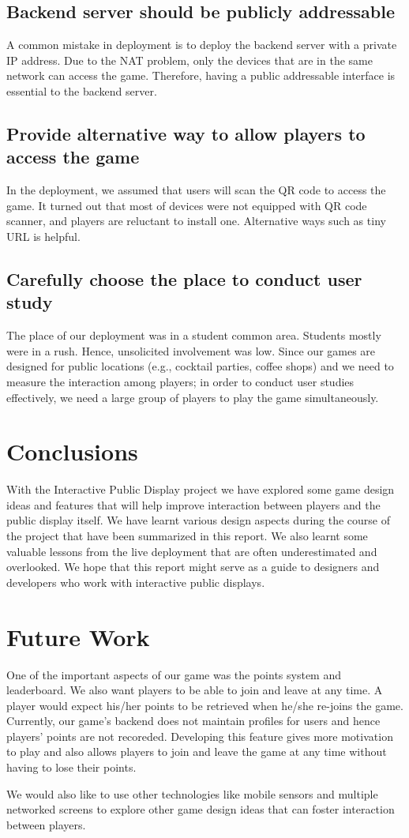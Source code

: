 \documentclass{sig-alternate}
\begin{document}
\subsection{Backend server should be publicly addressable}
A common mistake in 
deployment is to deploy the backend server with a private IP address. Due to 
the NAT problem, only the devices that are in the same network can access the 
game. Therefore, having a public addressable interface is essential to the backend server.

\subsection{Provide alternative way to allow players to access the game}
In the deployment, we assumed 
that users will scan the QR code to access the game. It turned out that most of devices 
were not equipped with QR code scanner, and players are reluctant to install one. 
Alternative ways such as tiny URL is helpful. 

\subsection{Carefully choose the place to conduct user study}
The place of our deployment was in 
a student common area. Students mostly were in a rush. Hence, unsolicited involvement 
was low. Since our games are designed for public locations (e.g., cocktail parties, coffee shops) and we need to measure the interaction among players; in order to conduct user studies effectively, we need a large group of players to play the game simultaneously.

\section{Conclusions}
With the Interactive Public Display project we have explored some game design ideas and features that will help 
improve interaction between players and the public display itself. We have learnt various design aspects during 
the course of the project that have been summarized in this report. We also learnt some valuable lessons from the 
live deployment that are often underestimated and overlooked\cite{storz:deployment_lessons}. We hope that this report might serve as a guide to 
designers and developers who work with interactive public displays.

\section{Future Work}
One of the important aspects of our game was the points system and leaderboard. We also want players to be able to join and leave at any time. A player would expect his/her points to be retrieved when 
he/she re-joins the game. 
Currently, our game's backend does not maintain profiles for users and hence players' points are not recoreded. Developing this feature gives more motivation to play and also allows players to join 
and leave the game at any time without having 
to lose their points.

We would also like to use other technologies like mobile sensors and multiple networked screens to explore other 
game design ideas that can foster interaction between players.



\end{document}
